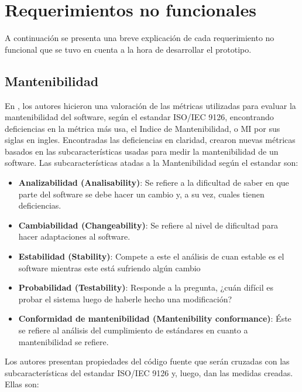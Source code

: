\section{Requerimientos no funcionales}

A continuación se presenta una breve explicación de cada requerimiento no funcional que se tuvo en cuenta a la hora de desarrollar el prototipo.

\subsection{Mantenibilidad}

En \cite{measuring_maintainability}, los autores hicieron una valoración de las métricas utilizadas para evaluar la mantenibilidad del software, según el estandar ISO/IEC 9126, encontrando deficiencias en la métrica más usa, el Indice de Mantenibilidad, o MI por sus siglas en ingles. Encontradas las deficiencias en claridad, crearon nuevas métricas basados en las subcaracterísticas usadas para medir la mantenibilidad de un software. Las subcaracterísticas atadas a la Mantenibilidad según el estandar son:

\begin{itemize}
 \item \textbf{Analizabilidad (Analisability)}: Se refiere a la dificultad de saber en que parte del software se debe hacer un cambio y, a su vez, cuales tienen deficiencias.
 \item \textbf{Cambiabilidad (Changeability)}: Se refiere al nivel de dificultad para hacer adaptaciones al software.
 \item \textbf{Estabilidad (Stability)}: Compete a este el análisis de cuan estable es el software mientras este está sufriendo algún cambio
 \item \textbf{Probabilidad (Testability)}: Responde a la pregunta, ¿cuán difícil es probar el sistema luego de haberle hecho una modificación?
 \item \textbf{Conformidad de mantenibilidad (Mantenibility conformance)}: Éste se refiere al análisis del cumplimiento de estándares en cuanto a mantenibilidad se refiere.
\end{itemize}

Los autores presentan propiedades del código fuente que serán cruzadas con las subcaracterísticas del estandar ISO/IEC 9126 y, luego, dan las medidas creadas. Ellas son:

